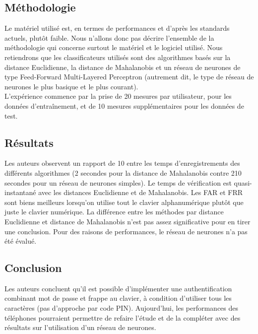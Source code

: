 \subsection{Méthodologie}

Le matériel utilisé est, en termes de performances et d'après les standards actuels, plutôt faible. Nous n'allons donc pas décrire l'ensemble de la méthodologie qui concerne surtout le matériel et le logiciel utilisé. Nous retiendrons que les classificateurs utilisés sont des algorithmes basés sur la distance Euclidienne, la distance de Mahalanobis et un réseau de neurones de type Feed-Forward Multi-Layered Perceptron (autrement dit, le type de réseau de neurones le plus basique et le plus courant).\\

L'expérience commence par la prise de 20 mesures par utilisateur, pour les données d'entraînement, et de 10 mesures supplémentaires pour les données de test.

\subsection{Résultats}

Les auteurs observent un rapport de 10 entre les temps d'enregistrements des différents algorithmes (2 secondes pour la distance de Mahalanobis contre 210 secondes pour un réseau de neurones simples). Le temps de vérification est quasi-instantané avec les distances Euclidienne et de Mahalanobis. Les FAR et FRR sont biens meilleurs lorsqu'on utilise tout le clavier alphanumérique plutôt que juste le clavier numérique. La différence entre les méthodes par distance Euclidienne et distance de Mahalanobis n'est pas assez significative pour en tirer une conclusion. Pour des raisons de performances, le réseau de neurones n'a pas été évalué.

\subsection{Conclusion}

Les auteurs concluent qu'il est possible d'implémenter une authentification combinant mot de passe et frappe au clavier, à condition d'utiliser tous les caractères (pas d'approche par code PIN). Aujourd'hui, les performances des téléphones pourraient permettre de refaire l'étude et de la compléter avec des résultats sur l'utilisation d'un réseau de neurones.
